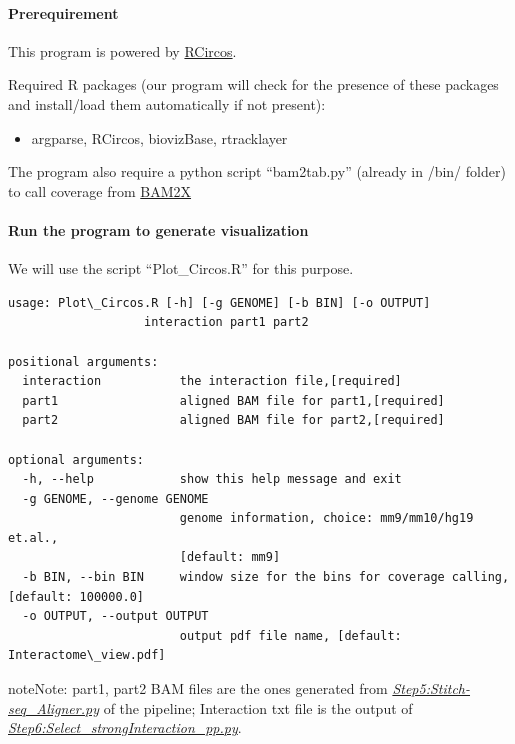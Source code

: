 \documentclass[letterpaper,10pt,english]{sphinxmanual}
\begin{document}
\paragraph{Prerequirement}
\label{Visualization:prerequirement}
This program is powered by \href{http://cran.r-project.org/web/packages/RCircos/index.html}{RCircos}.

Required R packages (our program will check for the presence of these packages and install/load them automatically if not present):
\begin{itemize}
\item {} 
argparse, RCircos, biovizBase, rtracklayer

\end{itemize}

The program also require a python script ``bam2tab.py'' (already in /bin/ folder) to call coverage from \href{https://github.com/nimezhu/bam2x/blob/master/scripts/bed2tab.py}{BAM2X}


\paragraph{Run the program to generate visualization}
\label{Visualization:run-the-program-to-generate-visualization}
We will use the script ``Plot\_Circos.R'' for this purpose.

\begin{Verbatim}[commandchars=\\\{\}]
usage: Plot\_Circos.R [-h] [-g GENOME] [-b BIN] [-o OUTPUT]
                   interaction part1 part2

positional arguments:
  interaction           the interaction file,[required]
  part1                 aligned BAM file for part1,[required]
  part2                 aligned BAM file for part2,[required]

optional arguments:
  -h, --help            show this help message and exit
  -g GENOME, --genome GENOME
                        genome information, choice: mm9/mm10/hg19 et.al.,
                        [default: mm9]
  -b BIN, --bin BIN     window size for the bins for coverage calling, [default: 100000.0]
  -o OUTPUT, --output OUTPUT
                        output pdf file name, [default: Interactome\_view.pdf]
\end{Verbatim}

\begin{notice}{note}{Note:}
part1, part2 BAM files are the ones generated from {\hyperref[Analysis_pipeline:step5]{\emph{Step5:Stitch-seq\_Aligner.py}}} of the pipeline; Interaction txt file is the output of {\hyperref[Analysis_pipeline:step6]{\emph{Step6:Select\_strongInteraction\_pp.py}}}.
\end{notice}
\end{document}
